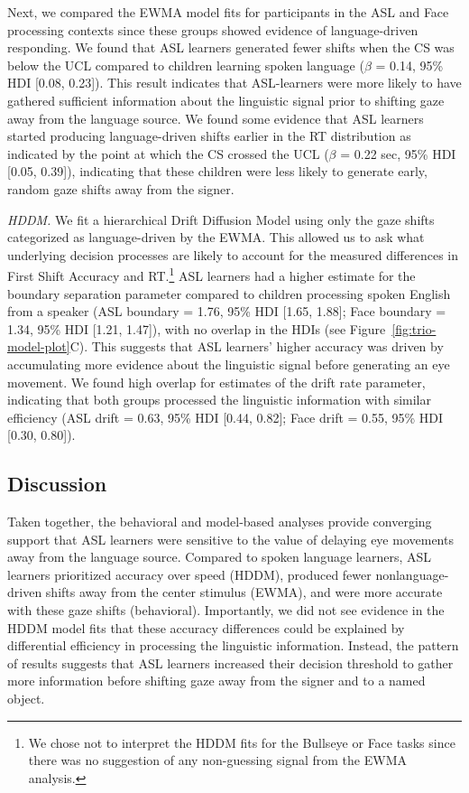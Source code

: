\documentclass[,man,floatsintext]{apa6}
\let\rmarkdownfootnote\footnote%
\def\footnote{\protect\rmarkdownfootnote}
\begin{document}
Next, we compared the EWMA model fits for participants in the ASL and
Face processing contexts since these groups showed evidence of
language-driven responding. We found that ASL learners generated fewer
shifts when the CS was below the UCL compared to children learning
spoken language (\(\beta\) = 0.14, 95\% HDI {[}0.08, 0.23{]}). This
result indicates that ASL-learners were more likely to have gathered
sufficient information about the linguistic signal prior to shifting
gaze away from the language source. We found some evidence that ASL
learners started producing language-driven shifts earlier in the RT
distribution as indicated by the point at which the CS crossed the UCL
(\(\beta\) = 0.22 sec, 95\% HDI {[}0.05, 0.39{]}), indicating that these
children were less likely to generate early, random gaze shifts away
from the signer.

\emph{HDDM.} We fit a hierarchical Drift Diffusion Model using only the
gaze shifts categorized as language-driven by the EWMA. This allowed us
to ask what underlying decision processes are likely to account for the
measured differences in First Shift Accuracy and RT.\footnote{We chose
  not to interpret the HDDM fits for the Bullseye or Face tasks since
  there was no suggestion of any non-guessing signal from the EWMA
  analysis.} ASL learners had a higher estimate for the boundary
separation parameter compared to children processing spoken English from
a speaker (ASL boundary = 1.76, 95\% HDI {[}1.65, 1.88{]}; Face boundary
= 1.34, 95\% HDI {[}1.21, 1.47{]}), with no overlap in the HDIs (see
Figure~\ref{fig:trio-model-plot}C). This suggests that ASL learners'
higher accuracy was driven by accumulating more evidence about the
linguistic signal before generating an eye movement. We found high
overlap for estimates of the drift rate parameter, indicating that both
groups processed the linguistic information with similar efficiency (ASL
drift = 0.63, 95\% HDI {[}0.44, 0.82{]}; Face drift = 0.55, 95\% HDI
{[}0.30, 0.80{]}).

\subsection{Discussion}\label{discussion}

Taken together, the behavioral and model-based analyses provide
converging support that ASL learners were sensitive to the value of
delaying eye movements away from the language source. Compared to spoken
language learners, ASL learners prioritized accuracy over speed (HDDM),
produced fewer nonlanguage-driven shifts away from the center stimulus
(EWMA), and were more accurate with these gaze shifts (behavioral).
Importantly, we did not see evidence in the HDDM model fits that these
accuracy differences could be explained by differential efficiency in
processing the linguistic information. Instead, the pattern of results
suggests that ASL learners increased their decision threshold to gather
more information before shifting gaze away from the signer and to a
named object.
\end{document}
